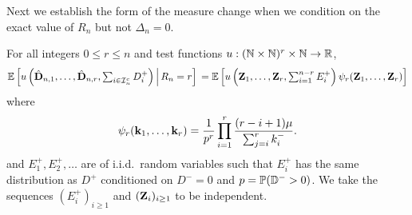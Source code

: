 Next we establish the form of the measure change when we condition on the exact value of $R_n$ but not $\Delta_n = 0$.

\begin{lemma}
    \label{lem:exact-measure-change-no-conditioning}
    For all integers $0 \leq r \leq n$ and test functions $u: ({\mathbb N} \times {\mathbb N})^r \times {\mathbb N} \to {\mathbb R}$,
    \begin{equation*}
        {\mathbb E} \left[ u\left( 
            \hat{{\mathbf D}}_{n, 1}, \ldots, \hat{{\mathbf D}}_{n, r}, \textstyle \sum_{i \in {\mathcal I}_n^c} D_i^+
        \right) \,\middle\vert\, R_n = r \right] \\
        =
        {\mathbb E} \left[
            u\left( {\mathbf Z}_1, \ldots, {\mathbf Z}_r, \textstyle \sum_{i = 1}^{n-r} E_i^+ \right)
            \psi_r({\mathbf Z}_1, \ldots, {\mathbf Z}_r)
        \right]
    \end{equation*}
    where
    \begin{equation*}
        \psi_r({\mathbf k}_1, \ldots, {\mathbf k}_r) =
        \frac{1}{p^r} \prod_{i=1}^r \frac{(r - i + 1)\mu}{\sum_{j=i}^r k_i^-}.
    \end{equation*}
    and $E_1^+, E_2^+, \ldots$ are of i.i.d.\ random variables such that $E_i^+$ has the same distribution as $D^+$ conditioned on $D^- = 0$ and $p = {\mathbb P}({\mathbb D}^- > 0)$. We take the sequences $(E_i^+)_{i \geq 1}$ and $({\mathbf Z}_i)_{i \geq 1}$ to be independent.
\end{lemma}

